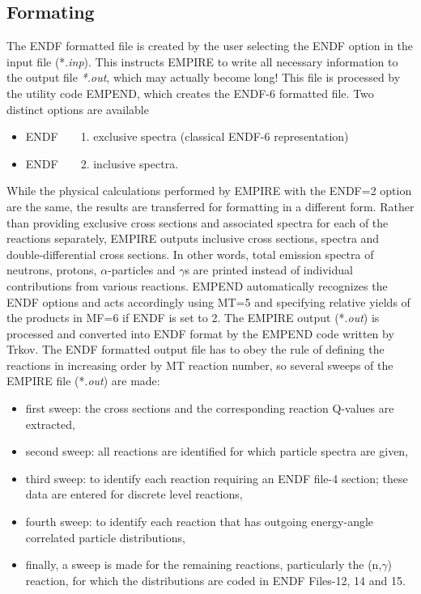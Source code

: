 \documentclass[twocolumn,amsmath,amssymb,10pt,groupedaddress,a4paper]{revtex4}
\begin{document}
\subsection{Formating}
The ENDF formatted file is created by the user selecting the ENDF
option in the input file ({*}.\emph{inp}). This instructs EMPIRE to
write all necessary information to the output file \emph{{*}.out},
which may actually become long! This file is processed by the utility
code EMPEND, which creates the ENDF-6 formatted file.
Two distinct options are available
\begin{itemize}
\item ENDF~~~~1. exclusive spectra (classical ENDF-6 representation)
\item ENDF~~~~2. inclusive spectra.
\end{itemize}
While the physical calculations performed by EMPIRE with the ENDF=2
option are the same, the results are transferred for formatting in
a different form. Rather than providing exclusive cross sections and
associated spectra for each of the reactions separately, EMPIRE outputs
inclusive cross sections, spectra and double-differential cross sections.
In other words, total emission spectra of neutrons, protons, $\alpha$-particles
and $\gamma$s are printed instead of individual contributions from
various reactions. EMPEND automatically recognizes
the ENDF options and acts accordingly using MT=5 and specifying relative
yields of the products in MF=6 if ENDF is set to 2.
The EMPIRE output ({*}.\emph{out}) is processed and converted into
ENDF format by the EMPEND code written by Trkov. The ENDF formatted
output file has to obey the rule of defining the reactions in increasing
order by MT reaction number, so several sweeps of the EMPIRE file
({*}.\emph{out}) are made:
\begin{itemize}
\item first sweep: the cross sections and the corresponding reaction Q-values
are extracted,
\item second sweep: all reactions are identified for which particle spectra
are given,
\item third sweep: to identify each reaction requiring an ENDF file-4 section;
these data are entered for discrete level reactions,
\item fourth sweep: to identify each reaction that has outgoing energy-angle
correlated particle distributions,
\item finally, a sweep is made for the remaining reactions, particularly
the (n,$\gamma$) reaction, for which the distributions are coded
in ENDF Files-12, 14 and 15.
\end{itemize}
\end{document}

